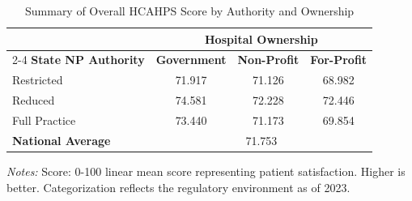 \begin{table}[htbp]
    \centering
    \caption{Summary of Overall HCAHPS Score by Authority and Ownership}
    \label{tab:hcahps_100_score_own}
    \vspace{0.2cm}
    \begin{tabular}{lccc}
        \toprule
        & \multicolumn{3}{c}{\textbf{Hospital Ownership}} \\
        \cmidrule(lr){2-4}
        \textbf{State NP Authority} & \textbf{Government} & \textbf{Non-Profit} & \textbf{For-Profit} \\
        \midrule
        Restricted & 71.917 & 71.126 & 68.982 \\
        Reduced & 74.581 & 72.228 & 72.446 \\
        Full Practice & 73.440 & 71.173 & 69.854 \\
        \midrule
        \textbf{National Average} & \multicolumn{3}{c}{71.753} \\
        \bottomrule
    \end{tabular}
    \vspace{0.1cm}
    \begin{minipage}{0.85\textwidth}
        \footnotesize \textit{Notes:} Score: 0-100 linear mean score representing patient satisfaction. Higher is better. Categorization reflects the regulatory environment as of 2023.
    \end{minipage}
\end{table}